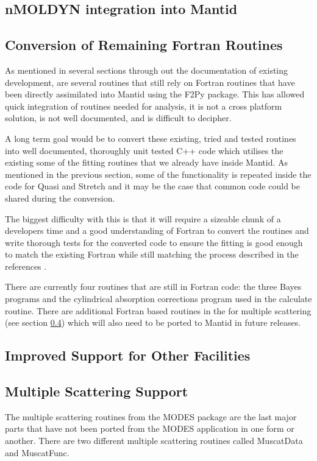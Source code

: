 \documentclass[paper=a4, fontsize=11pt]{scrartcl}	%
\numberwithin{equation}{section}															%
\numberwithin{figure}{section}																%
\numberwithin{table}{section}																%
\begin{document}
\subsection{nMOLDYN integration into Mantid}
\subsection{Conversion of Remaining Fortran Routines}
\label{subsec:convert-fortran}
As mentioned in several sections through out the documentation of existing development, are several routines that still rely on Fortran routines that have been directly assimilated into Mantid using the F2Py package. This has allowed quick integration of routines needed for analysis, it is not a cross platform solution, is not well documented, and is difficult to decipher.

A long term goal would be to convert these existing, tried and tested routines into well documented, thoroughly unit tested C++ code which utilises the existing some of the fitting routines that we already have inside Mantid. As mentioned in the previous section, some of the functionality is repeated inside the code for Quasi and Stretch and it may be the case that common code could be shared during the conversion.

The biggest difficulty with this is that it will require a sizeable chunk of a developers time and a good understanding of Fortran to convert the routines and write thorough tests for the converted code to ensure the fitting is good enough to match the existing Fortran while still matching the process described in the references \cite{dssivia1992}.

There are currently four routines that are still in Fortran code: the three Bayes programs and the cylindrical absorption corrections program used in the calculate routine. There are additional Fortran based routines in the for multiple scattering (see section \ref{subsec:multiple-scattering}) which will also need to be ported to Mantid in future releases.

\subsection{Improved Support for Other Facilities}
\subsection{Multiple Scattering Support}
\label{subsec:multiple-scattering}
The multiple scattering routines from the MODES package are the last major parts that have not been ported from the MODES application in one form or another. There are two different multiple scattering routines called MuscatData and MuscatFunc.



\end{document}
